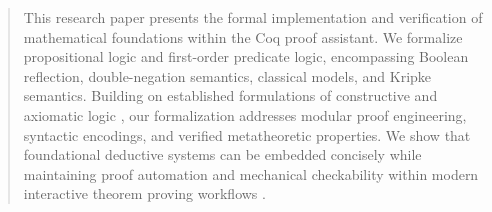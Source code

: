 \begin{abstract}
This research paper presents the formal implementation and verification of mathematical foundations within the Coq proof assistant. We formalize propositional logic and first-order predicate logic, encompassing Boolean reflection, double-negation semantics, classical models, and Kripke semantics. Building on established formulations of constructive and axiomatic logic \cite{vereshchagin2002lectures, krupski2019coq}, our formalization addresses modular proof engineering, syntactic encodings, and verified metatheoretic properties. We show that foundational deductive systems can be embedded concisely while maintaining proof automation and mechanical checkability within modern interactive theorem proving workflows \cite{coq2024refman, werner1997zfc}.
\end{abstract}

